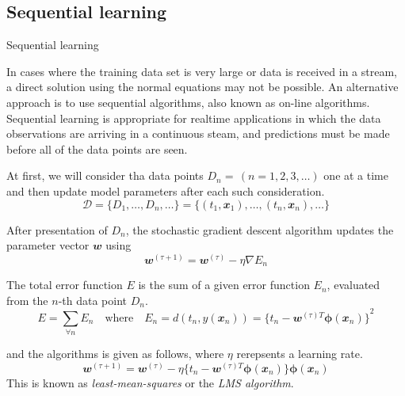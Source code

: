 \documentclass{bredelebeamer}
\begin{document}
\subsection{Sequential learning}
\begin{frame}{Sequential learning}
  \begin{justify}
    In cases where the training data set is very large or data is received in a
    stream, a direct solution using the normal equations may not be possible.
    An alternative approach is to use sequential algorithms, also known as on-line
    algorithms. Sequential learning is appropriate for realtime applications in
    which the data observations are arriving in a continuous steam, and predictions
    must be made before all of the data points are seen.

    At first, we will consider tha data points $D_n = \, (n = 1, 2, 3, \ldots)$
    one at a time and then update model parameters after each such consideration.
    \begin{equation}
      \mathcal{D} = \{D_1, \ldots, D_n, \ldots\}
                  = \{(t_1, \mathbfit{x}_1), \ldots, (t_n, \mathbfit{x}_n), \ldots\}
    \end{equation}

    After presentation of $D_n$, the stochastic gradient descent algorithm
    updates the parameter vector $\mathbfit{w}$ using
    \begin{equation}
      \mathbfit{w}^{(\tau+1)} = \mathbfit{w}^{(\tau)} - \eta \nabla E_{n}
    \end{equation}

    The total error function $E$ is the sum of a given error function $E_n$,
    evaluated from the $n$-th data point $D_n$.
    \begin{equation}
      E = \sum_{\forall n} E_n \quad \textrm{where} \quad
      E_n = d(t_n, y(\mathbfit{x}_n))
          = {\{ t_n - \mathbfit{w}^{(\tau)T} \boldsymbol{\phi} (\mathbfit{x}_n) \}}^2
    \end{equation}

    and the algorithms is given as follows, where $\eta$ rerepsents a learning rate.
    \begin{equation}
      \mathbfit{w}^{(\tau+1)} = \mathbfit{w}^{(\tau)} - \eta {\{ t_n - \mathbfit{w}^{(\tau)T} \boldsymbol{\phi} (\mathbfit{x}_n) \}}{\boldsymbol{\phi} (\mathbfit{x}_n)}
    \end{equation}
    This is known as \textit{least-mean-squares} or the \textit{LMS algorithm}.
  \end{justify}
\end{frame}
\end{document}
